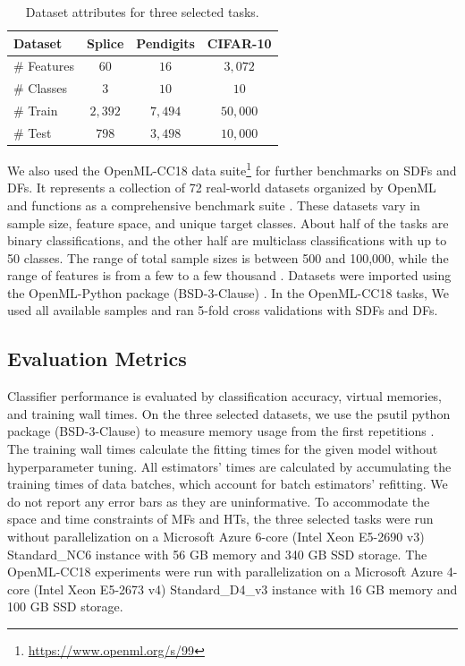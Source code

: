 \begin{table}[htb]
\centering
\begin{tabular}{lccc} 
\hline
Dataset & \textbf{Splice} & \textbf{Pendigits} & \textbf{CIFAR-10} \\
\hline
\# Features & $60$ & $16$ & $3,072$ \\
\hline
\# Classes & $3$ & $10$ & $10$ \\
\hline
\# Train & $2,392$ & $7,494$ & $50,000$ \\
\hline
\# Test & $798$ & $3,498$ & $10,000$ \\
\hline
\end{tabular}
\caption{Dataset attributes for three selected tasks.}
\label{table:data}
\end{table}

We also used the OpenML-CC18 data suite\footnote{\url{https://www.openml.org/s/99}} for further benchmarks on SDFs and DFs. It represents a collection of 72 real-world datasets organized by OpenML and functions as a comprehensive benchmark suite \citep{vanschoren_openml_2013, bischl_openml_2019}. These datasets vary in sample size, feature space, and unique target classes.
About half of the tasks are binary classifications, and the other half are multiclass classifications with up to 50 classes. The range of total sample sizes is between 500 and 100,000, while the range of features is from a few to a few thousand \citep{bischl_openml_2019}.
Datasets were imported using the OpenML-Python package (BSD-3-Clause) \citep{feurer_openml-python_2019}. In the OpenML-CC18 tasks, We used all available samples and ran 5-fold cross validations with SDFs and DFs.

\subsection{Evaluation Metrics}
Classifier performance is evaluated by classification accuracy, virtual memories, and training wall times. 
On the three selected datasets, we use the psutil python package (BSD-3-Clause) to measure memory usage from the first repetitions
\citep{rodola_giampaolopsutil_2022}.
The training wall times calculate the fitting times for the given model without hyperparameter tuning. All estimators' times are calculated by accumulating the training times of data batches, which account for batch estimators' refitting. We do not report any error bars as they are uninformative. 
To accommodate the space and time constraints of MFs and HTs, the three selected tasks were run without parallelization on a Microsoft Azure 6-core (Intel Xeon E5-2690 v3) Standard\_NC6 instance with 56 GB memory and 340 GB SSD storage.
The OpenML-CC18 experiments were run with parallelization on a Microsoft Azure 4-core (Intel Xeon E5-2673 v4) Standard\_D4\_v3 instance with 16 GB memory and 100 GB SSD storage.

